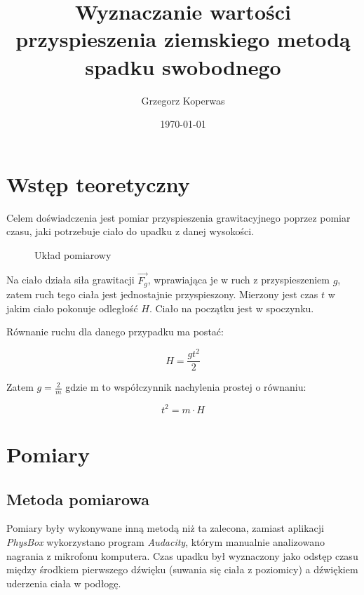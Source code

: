 \documentclass[a4paper,12pt]{article}
\title{Wyznaczanie wartości przyspieszenia ziemskiego metodą spadku swobodnego}
\author{Grzegorz Koperwas}
\date{\today}
\begin{document}


\section{Wstęp teoretyczny}

Celem doświadczenia jest pomiar przyspieszenia grawitacyjnego poprzez pomiar
czasu, jaki potrzebuje ciało do upadku z danej wysokości.

\begin{figure}[h]
	\centering 
	\caption{Układ pomiarowy}
\end{figure}

Na ciało działa siła grawitacji $\vec{F_g}$, wprawiająca je w ruch z
przyspieszeniem $g$, zatem ruch tego ciała jest jednostajnie przyspieszony.
Mierzony jest czas $t$ w jakim ciało pokonuje odległość $H$. Ciało na początku
jest w spoczynku.

Równanie ruchu dla danego przypadku ma postać:

\[ H = \frac{gt^2}{2} \]

Zatem $g = \frac{2}{m}$ gdzie m to współczynnik nachylenia prostej o równaniu:

\begin{equation}
	t^2 = m \cdot H
\end{equation}

\clearpage
\section{Pomiary}

\subsection*{Metoda pomiarowa}

Pomiary były wykonywane inną metodą niż ta zalecona, zamiast aplikacji
\emph{PhysBox} wykorzystano program \emph{Audacity}, którym manualnie
analizowano nagrania z mikrofonu komputera. Czas upadku był wyznaczony jako
odstęp czasu między środkiem pierwszego dźwięku (suwania się ciała z poziomicy)
a dźwiękiem uderzenia ciała w podłogę.
\end{document}
